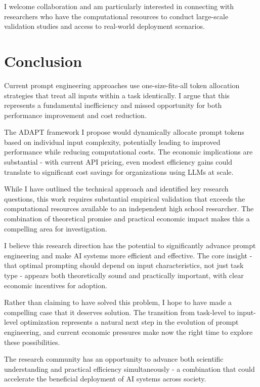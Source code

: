 \documentclass[11pt,a4paper]{article}
\begin{document}
I welcome collaboration and am particularly interested in connecting with researchers who have the computational resources to conduct large-scale validation studies and access to real-world deployment scenarios.

\section{Conclusion}

Current prompt engineering approaches use one-size-fits-all token allocation strategies that treat all inputs within a task identically. I argue that this represents a fundamental inefficiency and missed opportunity for both performance improvement and cost reduction.

The ADAPT framework I propose would dynamically allocate prompt tokens based on individual input complexity, potentially leading to improved performance while reducing computational costs. The economic implications are substantial - with current API pricing, even modest efficiency gains could translate to significant cost savings for organizations using LLMs at scale.

While I have outlined the technical approach and identified key research questions, this work requires substantial empirical validation that exceeds the computational resources available to an independent high school researcher. The combination of theoretical promise and practical economic impact makes this a compelling area for investigation.

I believe this research direction has the potential to significantly advance prompt engineering and make AI systems more efficient and effective. The core insight - that optimal prompting should depend on input characteristics, not just task type - appears both theoretically sound and practically important, with clear economic incentives for adoption.

Rather than claiming to have solved this problem, I hope to have made a compelling case that it deserves solution. The transition from task-level to input-level optimization represents a natural next step in the evolution of prompt engineering, and current economic pressures make now the right time to explore these possibilities.

The research community has an opportunity to advance both scientific understanding and practical efficiency simultaneously - a combination that could accelerate the beneficial deployment of AI systems across society.
\end{document}
